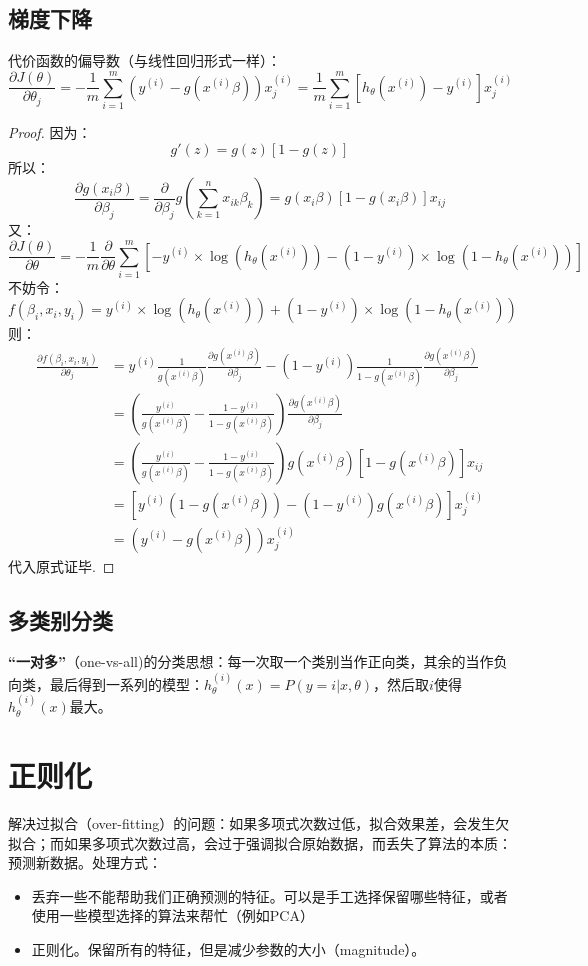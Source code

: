 \documentclass[cn,hazy,blue,normal,14pt]{elegantnote}
\begin{document}
\subsection{梯度下降}
代价函数的偏导数（与线性回归形式一样）：
$$
\frac{\partial J(\theta)}{\partial \theta_j}=-\frac{1}{m} \sum_{i=1}^{m} (y^{(i)}-g(x^{(i)}\beta))x_j^{(i)}=\frac{1}{m}\sum_{i=1}^{m}[h_\theta(x^{(i)})-y^{(i)}]x_j^{(i)}
$$
\begin{proof}
因为：
$$
g'(z)=g(z)[1-g(z)]
$$
所以：
$$
\frac{\partial g(x_i\beta)}{\partial \beta_j}=\frac{\partial }{\partial \beta_j}g(\sum_{k=1}^{n}x_{ik}\beta_k)=g(x_i\beta)[1-g(x_i\beta)]x_{ij}
$$
又：
$$
\frac{\partial J(\theta)}{\partial \theta}=-\frac{1}{m}\frac{\partial }{\partial \theta} \sum_{i=1}^{m} [-y^{(i)}\times \log(h_\theta(x^{(i)}))-(1-y^{(i)})\times \log(1-h_\theta(x^{(i)}))]
$$
不妨令：
$$
f(\beta_i,x_i,y_i)=y^{(i)}\times \log(h_\theta(x^{(i)}))+(1-y^{(i)})\times \log(1-h_\theta(x^{(i)}))
$$
则：
$$
\begin{aligned}
  \frac{\partial f(\beta_i,x_i,y_i)}{\partial \theta_j}&=y^{(i)}\frac{1}{g(x^{(i)}\beta)}\frac{\partial g(x^{(i)}\beta)}{\partial \beta_j}-(1-y^{(i)})\frac{1}{1-g(x^{(i)}\beta)}\frac{\partial g(x^{(i)}\beta)}{\partial \beta_j}  \\
  &=\left(\frac{y^{(i)}}{g(x^{(i)}\beta)}-\frac{1-y^{(i)}}{1-g(x^{(i)}\beta)}\right)\frac{\partial g(x^{(i)}\beta)}{\partial \beta_j} \\
  &=\left(\frac{y^{(i)}}{g(x^{(i)}\beta)}-\frac{1-y^{(i)}}{1-g(x^{(i)}\beta)}\right)g(x^{(i)}\beta)[1-g(x^{(i)}\beta)]x_{ij} \\
  &=[y^{(i)}(1-g(x^{(i)}\beta))-(1-y^{(i)})g(x^{(i)}\beta)]x^{(i)}_j \\
  &=(y^{(i)}-g(x^{(i)}\beta))x_j^{(i)}
\end{aligned}
$$
代入原式证毕.
\end{proof}
\subsection{多类别分类}
\textbf{“一对多”}（one-vs-all)的分类思想：每一次取一个类别当作正向类，其余的当作负向类，最后得到一系列的模型：$h_\theta^{(i)}(x)=P(y=i|x,\theta)$，然后取$i$使得$h_\theta^{(i)}(x)$最大。
\section{正则化}
解决过拟合（over-fitting）的问题：如果多项式次数过低，拟合效果差，会发生欠拟合；而如果多项式次数过高，会过于强调拟合原始数据，而丢失了算法的本质：预测新数据。处理方式：
\begin{itemize}
    \item 丢弃一些不能帮助我们正确预测的特征。可以是手工选择保留哪些特征，或者使用一些模型选择的算法来帮忙（例如PCA）
    \item 正则化。保留所有的特征，但是减少参数的大小（magnitude）。
\end{itemize}
\end{document}
